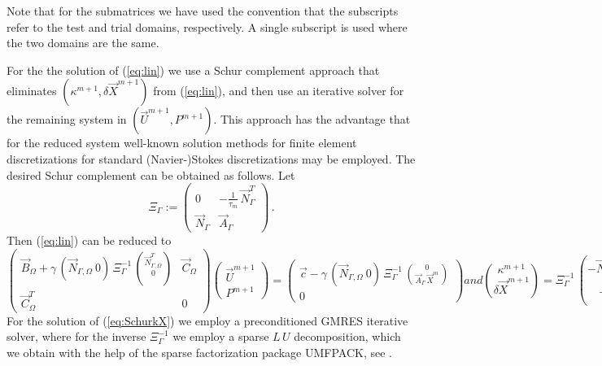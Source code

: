 \documentclass[a4paper,11pt,onecolumn]{article}
\newcommand{\NbulkT}{\vec{N}_{\Gamma,\Omega}^T}
\newcommand{\Nbulk}{\vec{N}_{\Gamma,\Omega}}
\begin{document}
Note that for the submatrices we have used the convention that the subscripts
refer to the test and trial domains, respectively. A single subscript is
used where the two domains are the same.

For the the solution of (\ref{eq:lin}) we use a Schur complement approach
that eliminates $(\kappa^{m+1}, \delta \vec X^{m+1})$ from (\ref{eq:lin}),
and then use an iterative solver for the remaining system in
$(\vec U^{m+1}, P^{m+1})$. This approach has the advantage that for the
reduced system well-known solution methods for finite element discretizations
for standard (Navier-)Stokes discretizations may be employed. The desired
Schur complement can be obtained as follows. Let
\begin{equation} \label{eq:Xi}
\Xi_\Gamma:= \begin{pmatrix}
 0 & - \frac1{\tau_m}\,\vec{N}_\Gamma^T \\
\vec{N}_\Gamma & \vec{A}_\Gamma
\end{pmatrix} \,.
\end{equation}
Then (\ref{eq:lin}) can be reduced to
\begin{subequations}
\begin{equation} \label{eq:SchurkX}
\begin{pmatrix}
\vec B_\Omega + \gamma\,(\Nbulk \ 0)\,\Xi_\Gamma^{-1}\,
\binom{\NbulkT}{0} & \vec C_\Omega \\
\vec C_\Omega^T & 0
\end{pmatrix}
\begin{pmatrix}
\vec U^{m+1} \\ P^{m+1}
\end{pmatrix}
= \begin{pmatrix}
\vec c
-\gamma\,(\Nbulk \ 0)\, \Xi_\Gamma^{-1}\,
\binom{0}{\vec{A}_\Gamma\,\vec X^m} \\
0
\end{pmatrix}
\end{equation}
and
\begin{equation}
\binom{\kappa^{m+1}}{\delta\vec{X}^{m+1}} = \Xi_\Gamma^{-1}\,
\binom{-\NbulkT\,\vec U^{m+1}}{-\vec{A}_\Gamma\,\vec X^m}\,.
\label{eq:SchurkXb}
\end{equation}
\end{subequations}
For the solution of (\ref{eq:SchurkX}) we employ a preconditioned GMRES
iterative solver, where for the inverse $\Xi_\Gamma^{-1}$ we employ a sparse
$L\,U$ decomposition, which we obtain with the help of the sparse factorization
package UMFPACK, see \cite{Davis04}.
\end{document}
